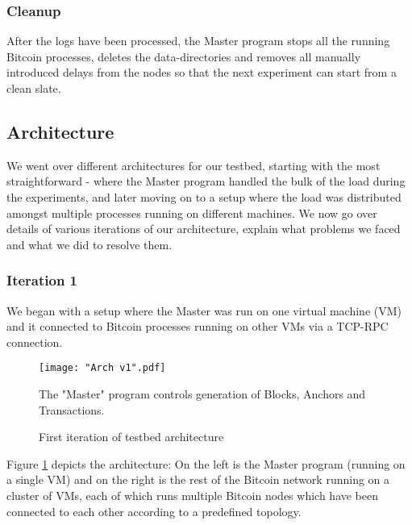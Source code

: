 \subsubsection{Cleanup}

After the logs have been processed, the Master program stops all the running Bitcoin processes, deletes the data-directories and removes all manually introduced delays from the nodes so that the next experiment can start from a clean slate.



\newpage
\subsection{Architecture} \label{impl-testbed-arch}

We went over different architectures for our testbed, starting with the most straightforward - where the Master program handled the bulk of the load during the experiments, and later moving on to a setup where the load was distributed amongst multiple processes running on different machines. We now go over details of various iterations of our architecture, explain what problems we faced and what we did to resolve them.

\subsubsection{Iteration 1} \label{impl-arch-1}

We began with a setup where the Master was run on one virtual machine (VM) and it connected to Bitcoin processes running on other VMs via a TCP-RPC connection.

\begin{figure}[!htb]
    \centering
    \texttt{[image: "Arch v1".pdf]}
    \caption{First iteration of testbed architecture}
    
    \medskip
    \footnotesize
    The "Master" program controls generation of Blocks, Anchors and Transactions.
    \label{fig-impl-arch-1}
\end{figure}

Figure \ref{fig-impl-arch-1} depicts the architecture: On the left is the Master program (running on a single VM) and on the right is the rest of the Bitcoin network running on a cluster of VMs, each of which runs multiple Bitcoin nodes which have been connected to each other according to a predefined topology.

